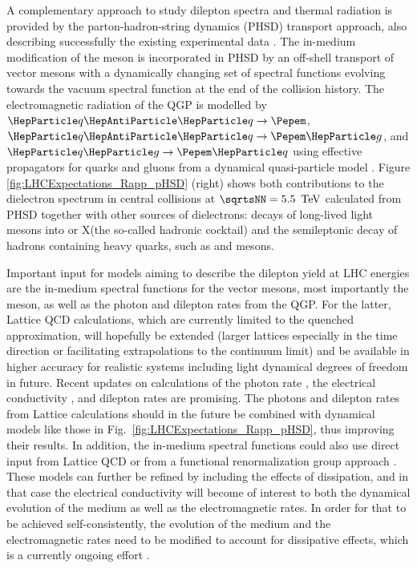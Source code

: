 \documentclass[../report.tex]{subfiles}
\begin{document}
A complementary approach to study dilepton spectra and thermal radiation is provided by the parton-hadron-string dynamics (PHSD) transport approach, also describing successfully the existing experimental data \cite{Linnyk:2015rco,Cassing:2009vt}. The in-medium modification of the \PGr meson is incorporated in PHSD by an off-shell transport of vector mesons with a dynamically changing set of spectral functions \cite{Bratkovskaya:2007jk} evolving towards the vacuum spectral function at the end of the collision history. The electromagnetic radiation of the QGP is modelled by $\PQq\PAQq\rightarrow\Pepem$, $\PQq\PAQq\rightarrow\Pepem\Pg$, and $\PQq\Pg\rightarrow\Pepem\PQq$ using effective propagators for quarks and gluons from a dynamical quasi-particle model \cite{Linnyk:2010vb}. Figure \ref{fig:LHCExpectations_Rapp_pHSD} (right) shows both contributions to the dielectron spectrum in central \PbPb{} collisions at $\sqrtsNN = \unit[5.5]{\UTeV}$ calculated from PHSD together with other sources of dielectrons: decays of long-lived light mesons into \Pepem or X\Pepem (the so-called hadronic cocktail) and the semileptonic decay of hadrons containing heavy quarks, such as \PD and \PB mesons. 

Important input for models aiming to describe the dilepton yield at LHC energies are the in-medium spectral functions for the vector mesons, most importantly the \PGr meson, as well as the photon and dilepton rates from the QGP. For the latter, Lattice QCD calculations, which are currently limited to the quenched approximation, will hopefully be extended (\eg larger lattices especially in the time direction or facilitating extrapolations to the continuum limit) and be available in higher accuracy for realistic systems including light dynamical degrees of freedom in future. Recent updates on calculations of the photon rate \cite{Ghiglieri:2016tvj}, the electrical conductivity \cite{Aarts:2014nba}, and dilepton rates \cite{Ding:2016hua} are promising.
The photons and dilepton rates from Lattice calculations should in the future be combined with dynamical models like those in Fig.~\ref{fig:LHCExpectations_Rapp_pHSD}, thus improving their results. In addition, the in-medium spectral functions could also use direct input from Lattice QCD \cite{Aarts:2005hg,Brandt:2015aqk} or from a functional renormalization group approach \cite{Jung:2016yxl}. These models can further be refined by including the effects of dissipation, and in that case the electrical conductivity will become of interest to both the dynamical evolution of the medium as well as the electromagnetic rates. In order for that to be achieved self-consistently, the evolution of the medium and the electromagnetic rates need to be modified to account for dissipative effects, which is a currently ongoing effort \cite{Paquet:2015lta,Vujanovic:2017wtw,Vujanovic:2017psb}.
\end{document}
